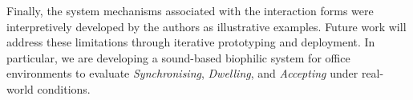 Finally, the system mechanisms associated with the interaction forms were interpretively developed by the authors as illustrative examples. Future work will address these limitations through iterative prototyping and deployment. In particular, we are developing a sound-based biophilic system for office environments to evaluate \emph{Synchronising}, \emph{Dwelling}, and \emph{Accepting} under real-world conditions.



